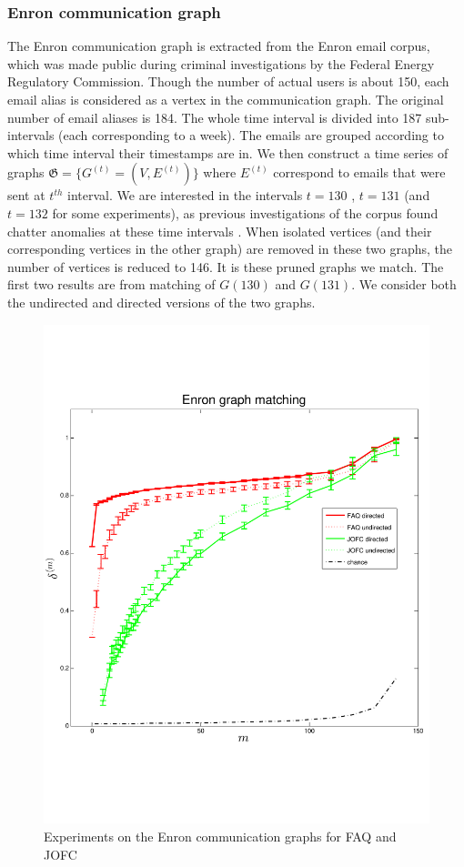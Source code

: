 \documentclass[12pt,oneside,final]{thesis}\usepackage[]{graphicx}\usepackage[]{color}
\begin{document}
\subsubsection{Enron communication graph}
The Enron communication graph is extracted from the  Enron  email corpus, which was made public during criminal investigations by the  Federal Energy Regulatory Commission. Though the number of actual users is about 150,  each email alias is considered as a vertex in the communication graph. The original number of email aliases is 184. The whole time interval is divided into 187 sub-intervals (each corresponding to a week). The emails are grouped according to which time interval their timestamps are in. We then construct a time series of graphs $\mathfrak{G}=\{G^{(t)} = (V,E^{(t)})\}$ where $E^{(t)}$ correspond to emails that were sent at $t^{th}$ interval. We are interested in the intervals $t=130$ , $t=131$ (and $t=132$ for some experiments), as previous  investigations of the corpus found chatter anomalies at these time intervals \cite{EnronStudy}. When isolated vertices (and their corresponding vertices in the other graph) are removed in these two graphs, the number of vertices is reduced to 146. It is these pruned graphs we match. The first two results are from matching of $G(130)$ and $G(131)$. We consider both the undirected and directed versions of the two graphs.


\begin{figure}
\includegraphics[scale=0.75]{enron-JOFC-FAQ-paper.pdf}
\caption{Experiments on the Enron communication graphs for FAQ and JOFC \label{enron_graphmatch_faq_jofc}}
\end{figure}
\end{document}

